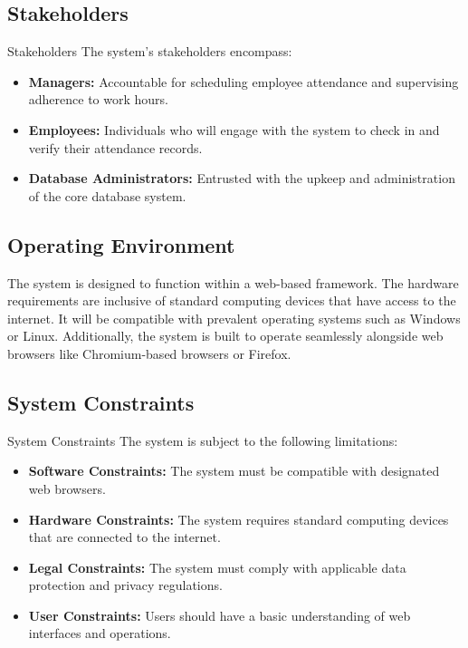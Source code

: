 \documentclass[a4paper, 12pt]{article}
\begin{document}
\subsection{Stakeholders}
Stakeholders The system’s stakeholders encompass:
\begin{itemize}
    \item \textbf{Managers:} Accountable for scheduling employee attendance and supervising adherence to work hours.
    \item \textbf{Employees:} Individuals who will engage with the system to check in and verify their attendance records.
    \item \textbf{Database Administrators:} Entrusted with the upkeep and administration of the core database system.
\end{itemize}

\subsection{Operating Environment}
The system is designed to function within a web-based framework. The hardware requirements are inclusive of standard computing devices that have access to the internet. It will be compatible with prevalent operating systems such as Windows or Linux. Additionally, the system is built to operate seamlessly alongside web browsers like Chromium-based browsers or Firefox.

\subsection{System Constraints}
System Constraints The system is subject to the following limitations:
\begin{itemize}
    \item \textbf{Software Constraints:} The system must be compatible with designated web browsers.
    \item \textbf{Hardware Constraints:} The system requires standard computing devices that are connected to the internet.
    \item \textbf{Legal Constraints:} The system must comply with applicable data protection and privacy regulations.
    \item \textbf{User Constraints:} Users should have a basic understanding of web interfaces and operations.
\end{itemize}
\end{document}
